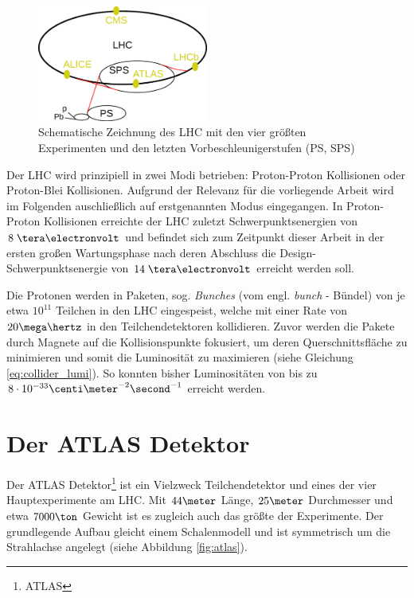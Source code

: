 \begin{figure}[h]
    \centering
    \includegraphics[width=0.5\textwidth]{img/LHC}
    \caption[Zeichnung des LHC mit Vorbeschleunigern und Experimenten]
        {Schematische Zeichnung des LHC mit den vier größten Experimenten und
        den letzten Vorbeschleunigerstufen (PS, SPS)}
    \label{fig:LHC}
\end{figure}

Der \ac{LHC} wird prinzipiell in zwei Modi betrieben: Proton-Proton Kollisionen
oder Proton-Blei Kollisionen. Aufgrund der Relevanz für die vorliegende Arbeit
wird im Folgenden auschließlich auf erstgenannten Modus eingegangen. In
Proton-Proton Kollisionen erreichte der \ac{LHC} zuletzt Schwerpunktsenergien
von $8\TeV$ und befindet sich zum Zeitpunkt dieser Arbeit in der ersten großen
Wartungsphase nach deren Abschluss die Design-Schwerpunktsenergie von $14\TeV$
erreicht werden soll.

Die Protonen werden in Paketen, sog. \textit{Bunches} (vom engl. \textit{bunch}
- Bündel) von je etwa $10^{11}$ Teilchen in den \ac{LHC} eingespeist, welche
mit einer Rate von $20\mega\hertz$ in den Teilchendetektoren kollidieren.
Zuvor werden die Pakete durch Magnete auf die Kollisionspunkte fokusiert, um
deren Querschnittsfläche zu minimieren und somit die Luminosität zu maximieren
(siehe Gleichung \ref{eq:collider_lumi}). So konnten bisher Luminositäten von
bis zu $8\cdot 10^{-33} \centi\meter^{-2}\second^{-1}$ erreicht werden.



%
\section{Der ATLAS Detektor}
\label{atlas_detector}


Der ATLAS Detektor\footnote{\acf{ATLAS}} ist ein Vielzweck Teilchendetektor und
eines der vier Hauptexperimente am \ac{LHC}. Mit $44\meter$ Länge, $25\meter$
Durchmesser und etwa $7000\ton$ Gewicht ist es zugleich auch das größte der
Experimente. Der grundlegende Aufbau gleicht einem Schalenmodell und ist
symmetrisch um die Strahlachse angelegt (siehe Abbildung \ref{fig:atlas}).

